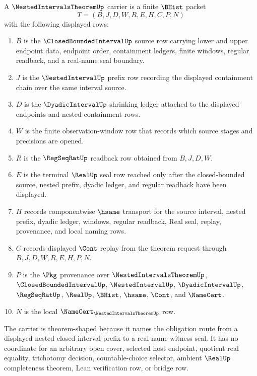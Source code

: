 \begin{definition}
\label{def:nested-intervals-theorem-carrier}
A $\NestedIntervalsTheoremUp$ carrier is a finite $\BHist$ packet
$$
T=(B,J,D,W,R,E,H,C,P,N)
$$
with the following displayed rows:
\begin{enumerate}
\item $B$ is the $\ClosedBoundedIntervalUp$ source row carrying lower and upper endpoint data, endpoint order, containment ledgers, finite windows, regular readback, and a real-name seal boundary.
\item $J$ is the $\NestedIntervalUp$ prefix row recording the displayed containment chain over the same interval source.
\item $D$ is the $\DyadicIntervalUp$ shrinking ledger attached to the displayed endpoints and nested-containment rows.
\item $W$ is the finite observation-window row that records which source stages and precisions are opened.
\item $R$ is the $\RegSeqRatUp$ readback row obtained from $B,J,D,W$.
\item $E$ is the terminal $\RealUp$ seal row reached only after the closed-bounded source, nested prefix, dyadic ledger, and regular readback have been displayed.
\item $H$ records componentwise $\hsame$ transport for the source interval, nested prefix, dyadic ledger, windows, regular readback, Real seal, replay, provenance, and local naming rows.
\item $C$ records displayed $\Cont$ replay from the theorem request through $B,J,D,W,R,E,H,P,N$.
\item $P$ is the $\Pkg$ provenance over $\NestedIntervalsTheoremUp$, $\ClosedBoundedIntervalUp$, $\NestedIntervalUp$, $\DyadicIntervalUp$, $\RegSeqRatUp$, $\RealUp$, $\BHist$, $\hsame$, $\Cont$, and $\NameCert$.
\item $N$ is the local $\NameCert_{\NestedIntervalsTheoremUp}$ row.
\end{enumerate}
The carrier is theorem-shaped because it names the obligation route from a displayed nested closed-interval prefix to a real-name witness seal. It has no coordinate for an arbitrary open cover, selected host endpoint, quotient real equality, trichotomy decision, countable-choice selector, ambient $\RealUp$ completeness theorem, Lean verification row, or bridge row.
\end{definition}

